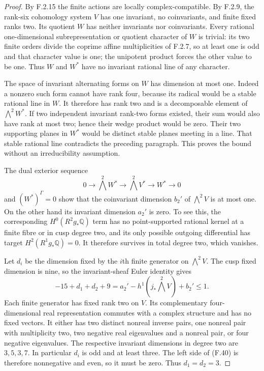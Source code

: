 \begin{proof}
By F.2.15 the finite actions are locally complex-compatible.
By F.2.9, the rank-six cohomology system $V$ has one
invariant, no coinvariants, and finite fixed ranks two.
Its quotient $W$ has neither invariants nor coinvariants.
Every rational one-dimensional subrepresentation or
quotient character of $W$ is trivial: its two finite
orders divide the coprime affine multiplicities of F.2.7,
so at least one is odd and that character value is one;
the unipotent product forces the other value to be one.
Thus $W$ and $W^*$ have no invariant rational line of any
character.

The space of invariant alternating forms on $W$ has
dimension at most one.  Indeed a nonzero such form cannot
have rank four, because its radical would be a stable
rational line in $W$.  It therefore has rank two and is
a decomposable element of $\bigwedge^2W^*$.
If two independent invariant rank-two forms existed,
their sum would also have rank at most two; hence their
wedge product would be zero.  Their two supporting
planes in $W^*$ would be distinct stable planes meeting
in a line.  That stable rational line contradicts the
preceding paragraph.  This proves the bound without an
irreducibility assumption.

The dual exterior sequence
\[
 0\longrightarrow\bigwedge^2W^*
 \longrightarrow\bigwedge^2V^*
 \longrightarrow W^*\longrightarrow0
\]
and $(W^*)^\Gamma=0$ show that the coinvariant dimension
$b_2'$ of $\bigwedge^2V$ is at most one.
On the other hand its invariant dimension $a_2'$ is zero.
To see this, the corresponding $H^0(R^2g_*\mathbb Q)$
term has no point-supported rational kernel at a finite
fibre or in cusp degree two, and its only possible outgoing
differential has target $H^2(R^1g_*\mathbb Q)=0$.
It therefore survives in total degree two, which vanishes.

Let $d_i$ be the dimension fixed by the $i$th finite
generator on $\bigwedge^2V$.  The cusp fixed dimension is
nine, so the invariant-sheaf Euler identity gives
\[
 -15+d_1+d_2+9
       =a_2'-h^1(j_*\bigwedge^2V)+b_2'\leq1.
 \tag{F.40}
\]
Each finite generator has fixed rank two on $V$.
Its complementary four-dimensional real representation
commutes with a complex structure and has no fixed vectors.
It either has two distinct nonreal inverse pairs, one
nonreal pair with multiplicity two, two negative real
eigenvalues and a nonreal pair, or four negative eigenvalues.
The respective invariant dimensions in degree two are
$3,5,3,7$.  In particular $d_i$ is odd and at least three.
The left side of (F.40) is therefore nonnegative and even,
so it must be zero.  Thus $d_1=d_2=3$.


\end{proof}
